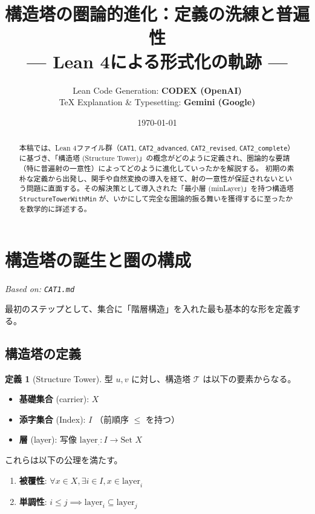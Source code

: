 \documentclass[a4paper,11pt]{ltjsarticle}
\title{\textbf{構造塔の圏論的進化：定義の洗練と普遍性} \\ \large --- Lean 4による形式化の軌跡 ---}
\author{
    Lean Code Generation: \textbf{CODEX (OpenAI)} \\
    TeX Explanation \& Typesetting: \textbf{Gemini (Google)}
}
\date{\today}
\theoremstyle{definition}
\newtheorem{definition}{定義}[section]
\newcommand{\Tower}{\mathcal{T}}
\newcommand{\Layer}[1]{\mathrm{layer}_{#1}}
\begin{document}
\maketitle

\begin{abstract}
本稿では、Lean 4ファイル群（\texttt{CAT1}, \texttt{CAT2\_advanced}, \texttt{CAT2\_revised}, \texttt{CAT2\_complete}）に基づき、「構造塔 (Structure Tower)」の概念がどのように定義され、圏論的な要請（特に普遍射の一意性）によってどのように進化していったかを解説する。
初期の素朴な定義から出発し、関手や自然変換の導入を経て、射の一意性が保証されないという問題に直面する。その解決策として導入された「最小層 (minLayer)」を持つ構造塔 \texttt{StructureTowerWithMin} が、いかにして完全な圏論的振る舞いを獲得するに至ったかを数学的に詳述する。
\end{abstract}

\tableofcontents
\newpage

\section{構造塔の誕生と圏の構成}
\label{sec:cat1}
\textit{Based on: \texttt{CAT1.md}}

最初のステップとして、集合に「階層構造」を入れた最も基本的な形を定義する。

\subsection{構造塔の定義}
\begin{definition}[Structure Tower]
型 $u, v$ に対し、構造塔 $\Tower$ は以下の要素からなる。
\begin{itemize}
    \item \textbf{基礎集合} (carrier): $X$
    \item \textbf{添字集合} (Index): $I$ （前順序 $\le$ を持つ）
    \item \textbf{層} (layer): 写像 $\Layer{\cdot}: I \to \text{Set } X$
\end{itemize}
これらは以下の公理を満たす。
\begin{enumerate}
    \item \textbf{被覆性}: $\forall x \in X, \exists i \in I, x \in \Layer{i}$
    \item \textbf{単調性}: $i \le j \implies \Layer{i} \subseteq \Layer{j}$
\end{enumerate}
\end{definition}
\end{document}
